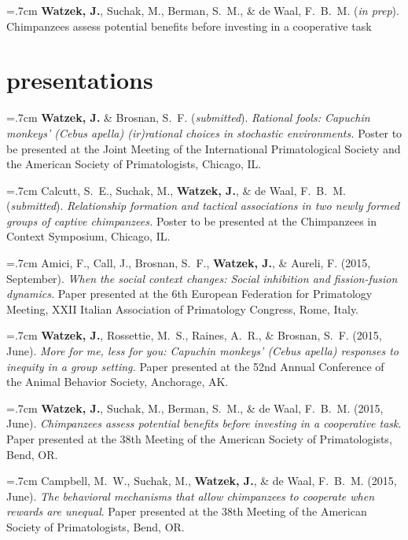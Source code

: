 \documentclass[]{friggeri-cv}
\begin{document}
\hangindent=.7cm \textbf{Watzek, J.}, Suchak, M., Berman, S.~M., \& de Waal, F.~B.~M. (\emph{in prep}). Chimpanzees assess potential benefits before investing in a cooperative task\\[-.1cm]



\section{presentations}

\hangindent=.7cm \textbf{Watzek, J.} \& Brosnan, S.~F. (\emph{submitted}). \emph{Rational fools: Capuchin monkeys' \emph{(Cebus apella)} (ir)rational choices in stochastic environments.} Poster to be presented at the Joint Meeting of the International Primatological Society and the American Society of Primatologists, Chicago, IL.

\hangindent=.7cm Calcutt, S.~E., Suchak, M., \textbf{Watzek, J.}, \& de Waal, F.~B.~M. (\emph{submitted}). \emph{Relationship formation and tactical associations in two newly formed groups of captive chimpanzees.} Poster to be presented at the Chimpanzees in Context Symposium, Chicago, IL.

\hangindent=.7cm Amici, F., Call, J., Brosnan, S.~F., \textbf{Watzek, J.}, \& Aureli, F. (2015, September). \emph{When the social context changes: Social inhibition and fission-fusion dynamics.} Paper presented at the 6th European Federation for Primatology Meeting, XXII Italian Association of Primatology Congress, Rome, Italy.

\hangindent=.7cm \textbf{Watzek, J.}, Rossettie, M.~S., Raines, A.~R., \& Brosnan, S.~F. (2015, June). \emph{More for me, less for you: Capuchin monkeys' (\emph{Cebus apella}) responses to inequity in a group setting.} Paper presented at the 52nd Annual Conference of the Animal Behavior Society, Anchorage, AK.

\hangindent=.7cm \textbf{Watzek, J.}, Suchak, M., Berman, S.~M., \& de Waal, F.~B.~M. (2015, June). \emph{Chimpanzees assess potential benefits before investing in a cooperative task}. Paper presented at the 38th Meeting of the American Society of Primatologists, Bend, OR.

\hangindent=.7cm Campbell, M.~W., Suchak, M., \textbf{Watzek, J.}, \& de Waal, F.~B.~M. (2015, June). \emph{The behavioral mechanisms that allow chimpanzees to cooperate when rewards are unequal}. Paper presented at the 38th Meeting of the American Society of Primatologists, Bend, OR.
\end{document}
